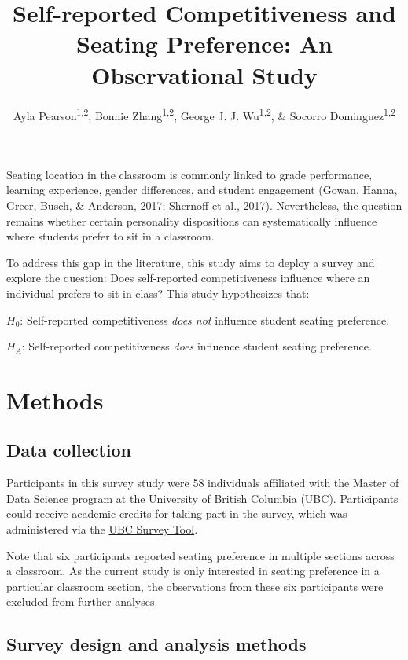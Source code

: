 \documentclass[man]{apa6}
\title{Self-reported Competitiveness and Seating Preference: An Observational Study}
\author{Ayla Pearson\textsuperscript{1,2}, Bonnie Zhang\textsuperscript{1,2}, George J. J. Wu\textsuperscript{1,2}, \& Socorro Dominguez\textsuperscript{1,2}}
\date{}
\affiliation{
\vspace{0.5cm}
\textsuperscript{1} The University of British Columbia\\\textsuperscript{2} Master of Data Science Program}
\begin{document}
\maketitle

Seating location in the classroom is commonly linked to grade performance, learning experience, gender differences, and student engagement (Gowan, Hanna, Greer, Busch, \& Anderson, 2017; Shernoff et al., 2017). Nevertheless, the question remains whether certain personality dispositions can systematically influence where students prefer to sit in a classroom.

To address this gap in the literature, this study aims to deploy a survey and explore the question: Does self-reported competitiveness influence where an individual prefers to sit in class? This study hypothesizes that:

\(H_{0}\): Self-reported competitiveness \emph{does not} influence student seating preference.

\(H_{A}\): Self-reported competitiveness \emph{does} influence student seating preference.

\hypertarget{methods}{%
\section{Methods}\label{methods}}

\hypertarget{data-collection}{%
\subsection{Data collection}\label{data-collection}}

Participants in this survey study were 58 individuals affiliated with the Master of Data Science program at the University of British Columbia (UBC). Participants could receive academic credits for taking part in the survey, which was administered via the \href{https://it.ubc.ca/services/teaching-learning-tools/survey-tool}{UBC Survey Tool}.

Note that six participants reported seating preference in multiple sections across a classroom. As the current study is only interested in seating preference in a particular classroom section, the observations from these six participants were excluded from further analyses.

\hypertarget{survey-design-and-analysis-methods}{%
\subsection{Survey design and analysis methods}\label{survey-design-and-analysis-methods}}
\end{document}
